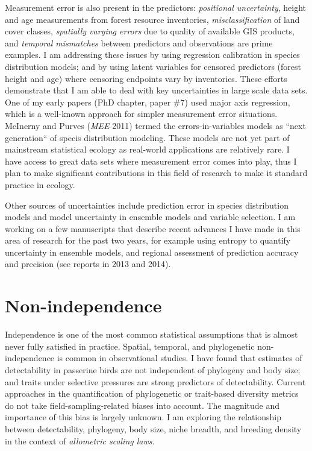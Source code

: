 Measurement error is also present in the predictors: \emph{positional uncertainty}, height and age measurements from forest resource inventories, \emph{misclassification} of land cover classes, \emph{spatially varying errors} due to quality of available GIS products, and \emph{temporal mismatches} between predictors and observations are prime examples. I am addressing these issues by using regression calibration in species distribution models; and by using latent variables for censored predictors (forest height and age) where censoring endpoints vary by inventories. These efforts demonstrate that I am able to deal with key uncertainties in large scale data sets. One of my early papers (PhD chapter, paper \#7) used major axis regression, which is a well-known approach for simpler measurement error situations. McInerny and Purves (\emph{MEE} 2011) termed the errors-in-variables models as ``next generation`` of specis distribution modeling. These models are not yet part of mainstream statistical ecology as real-world applications are relatively rare. I have access to great data sets where measurement error comes into play, thus I plan to make significant contributions in this field of research to make it standard practice in ecology.
\vspace{0.5pc}

Other sources of uncertainties include prediction error in species distribution models and model uncertainty in ensemble models and variable selection. I am working on a few manuscripts that describe recent advances I have made in this area of research for the past two years, for example
using entropy to quantify uncertainty in ensemble models, and regional assessment of prediction accuracy and precision (see reports in 2013 and 2014).


\section{ Non-independence } %

Independence is one of the most common statistical assumptions that is almost never fully satisfied in practice. Spatial, temporal, and phylogenetic non-independence is common in observational studies. 
I have found that estimates of detectability in passerine birds are not independent of phylogeny and body size; and traits under selective pressures are strong predictors of detectability. Current approaches in the quantification of phylogenetic or trait-based diversity metrics do not take field-sampling-related biases into account. The magnitude and importance of this bias is largely unknown. I am exploring the relationship between detectability, phylogeny, body size, niche breadth, and breeding density in the context of \emph{allometric scaling laws}. 
\vspace{0.5pc}

